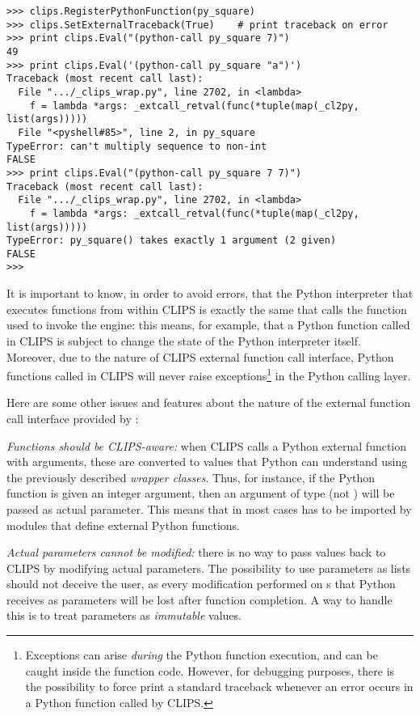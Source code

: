 \begin{verbatim}
>>> clips.RegisterPythonFunction(py_square)
>>> clips.SetExternalTraceback(True)	# print traceback on error
>>> print clips.Eval("(python-call py_square 7)")
49
>>> print clips.Eval('(python-call py_square "a")')
Traceback (most recent call last):
  File ".../_clips_wrap.py", line 2702, in <lambda>
    f = lambda *args: _extcall_retval(func(*tuple(map(_cl2py, list(args)))))
  File "<pyshell#85>", line 2, in py_square
TypeError: can't multiply sequence to non-int
FALSE
>>> print clips.Eval("(python-call py_square 7 7)")
Traceback (most recent call last):
  File ".../_clips_wrap.py", line 2702, in <lambda>
    f = lambda *args: _extcall_retval(func(*tuple(map(_cl2py, list(args)))))
TypeError: py_square() takes exactly 1 argument (2 given)
FALSE
>>>
\end{verbatim}

It is important to know, in order to avoid errors, that the Python
interpreter that executes functions from within CLIPS is exactly the
same that calls the \pyclips{} function used to invoke the engine: this
means, for example, that a Python function called in CLIPS is subject
to change the state of the Python interpreter itself. Moreover, due
to the nature of CLIPS external function call interface, Python functions
called in CLIPS will never raise exceptions\footnote{Exceptions can
arise \emph{during} the Python function execution, and can be caught
inside the function code. However, for debugging purposes, there is the
possibility to force \pyclips{} print a standard traceback whenever an
error occurs in a Python function called by CLIPS.} in the Python calling
layer.

Here are some other issues and features about the nature of the external
function call interface provided by \pyclips{}:

\emph{Functions should be CLIPS-aware:} when CLIPS calls a Python external
function with arguments, these are converted to values that Python can
understand using the previously described \emph{wrapper classes}. Thus,
for instance, if the Python function is given an integer argument, then
an argument of type  (not ) will be passed as
actual parameter. This means that in most cases \pyclips{} has to be
imported by modules that define external Python functions.

\emph{Actual parameters cannot be modified:} there is no way to pass values
back to CLIPS by modifying actual parameters. The possibility to use
 parameters as lists should not deceive the user, as
every modification performed on s that Python receives
as parameters will be lost after function completion. A way to handle this
is to treat parameters as \emph{immutable} values.

